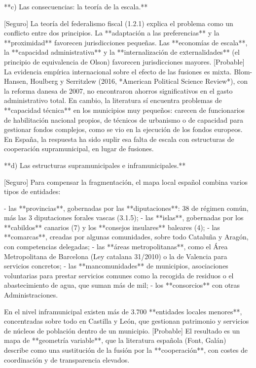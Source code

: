 \documentclass[10pt,a4paper]{article}
\begin{document}
**c) Las consecuencias: la teoría de la escala.**

[Seguro] La teoría del federalismo fiscal (1.2.1) explica el problema como un conflicto entre dos principios. La **adaptación a las preferencias** y la **proximidad** favorecen jurisdicciones pequeñas. Las **economías de escala**, la **capacidad administrativa** y la **internalización de externalidades** (el principio de equivalencia de Olson) favorecen jurisdicciones mayores. [Probable] La evidencia empírica internacional sobre el efecto de las fusiones es mixta. Blom-Hansen, Houlberg y Serritzlew (2016, *American Political Science Review*), con la reforma danesa de 2007, no encontraron ahorros significativos en el gasto administrativo total. En cambio, la literatura sí encuentra problemas de **capacidad técnica** en los municipios muy pequeños: carecen de funcionarios de habilitación nacional propios, de técnicos de urbanismo o de capacidad para gestionar fondos complejos, como se vio en la ejecución de los fondos europeos. En España, la respuesta ha sido suplir esa falta de escala con estructuras de cooperación supramunicipal, en lugar de fusiones.

**d) Las estructuras supramunicipales e inframunicipales.**

[Seguro] Para compensar la fragmentación, el mapa local español combina varios tipos de entidades:

- las **provincias**, gobernadas por las **diputaciones**: 38 de régimen común, más las 3 diputaciones forales vascas (3.1.5);
- las **islas**, gobernadas por los **cabildos** canarios (7) y los **consejos insulares** baleares (4);
- las **comarcas**, creadas por algunas comunidades, sobre todo Cataluña y Aragón, con competencias delegadas;
- las **áreas metropolitanas**, como el Área Metropolitana de Barcelona (Ley catalana 31/2010) o la de Valencia para servicios concretos;
- las **mancomunidades** de municipios, asociaciones voluntarias para prestar servicios comunes como la recogida de residuos o el abastecimiento de agua, que suman más de mil;
- los **consorcios** con otras Administraciones.

En el nivel inframunicipal existen más de 3.700 **entidades locales menores**, concentradas sobre todo en Castilla y León, que gestionan patrimonio y servicios de núcleos de población dentro de un municipio. [Probable] El resultado es un mapa de **geometría variable**, que la literatura española (Font, Galán) describe como una sustitución de la fusión por la **cooperación**, con costes de coordinación y de transparencia elevados.
\end{document}
